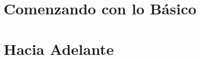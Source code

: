 \documentclass[10pt]{book}
\begin{document}
\fi

% 


\mainmatter

\part{Comenzando con lo Básico}


























\part{Hacia Adelante}











\appendix



\printindex

\end{document}
